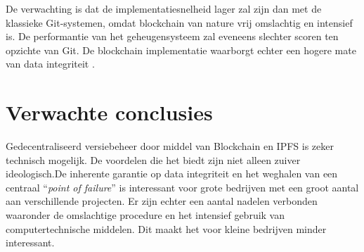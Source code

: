 \noindent De verwachting is dat de implementatiesnelheid lager zal zijn dan met de klassieke Git-systemen, omdat blockchain van nature vrij omslachtig en intensief is. De performantie van het geheugensysteem zal eveneens slechter scoren ten opzichte van Git. De blockchain implementatie waarborgt echter een hogere mate van data integriteit .  

\section{Verwachte conclusies}
\label{sec:verwachte_conclusies}

Gedecentraliseerd versiebeheer door middel van Blockchain en IPFS is zeker technisch mogelijk. De voordelen die het biedt zijn niet alleen zuiver ideologisch.De inherente garantie op data integriteit en het weghalen van een centraal ``\textit{point of failure}'' is interessant voor grote bedrijven met een groot aantal aan verschillende projecten. Er zijn echter een aantal nadelen verbonden waaronder de omslachtige procedure en het intensief gebruik van computertechnische middelen. Dit maakt het voor kleine bedrijven minder interessant.